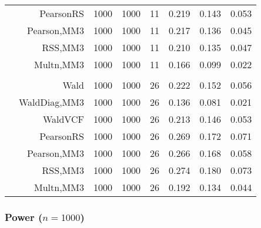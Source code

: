 \documentclass[
]{article}
\begin{document}
\begin{table}[H]
{\begin{tabular}[t]{lrrrrrrr}
\hspace{1em} & PearsonRS & 1000 & 1000 & 11 & 0.219 & 0.143 & 0.053\\

\hspace{1em} & Pearson,MM3 & 1000 & 1000 & 11 & 0.217 & 0.136 & 0.045\\

\hspace{1em} & RSS,MM3 & 1000 & 1000 & 11 & 0.210 & 0.135 & 0.047\\

\hspace{1em} & Multn,MM3 & 1000 & 1000 & 11 & 0.166 & 0.099 & 0.022\\
\cmidrule{1-8}
\addlinespace[0.3em]
\multicolumn{8}{l}{\textbf{3F 15V}}\\
\hspace{1em} & Wald & 1000 & 1000 & 26 & 0.222 & 0.152 & 0.056\\

\hspace{1em} & WaldDiag,MM3 & 1000 & 1000 & 26 & 0.136 & 0.081 & 0.021\\

\hspace{1em} & WaldVCF & 1000 & 1000 & 26 & 0.213 & 0.146 & 0.053\\

\hspace{1em} & PearsonRS & 1000 & 1000 & 26 & 0.269 & 0.172 & 0.071\\

\hspace{1em} & Pearson,MM3 & 1000 & 1000 & 26 & 0.266 & 0.168 & 0.058\\

\hspace{1em} & RSS,MM3 & 1000 & 1000 & 26 & 0.274 & 0.180 & 0.073\\

\hspace{1em} & Multn,MM3 & 1000 & 1000 & 26 & 0.192 & 0.134 & 0.044\\
\bottomrule
\end{tabular}}
\endgroup{}
\end{table}

\hypertarget{power-n1000}{%
\subsubsection{\texorpdfstring{Power
(\(n=1000\))}{Power (n=1000)}}\label{power-n1000}}
\end{document}
